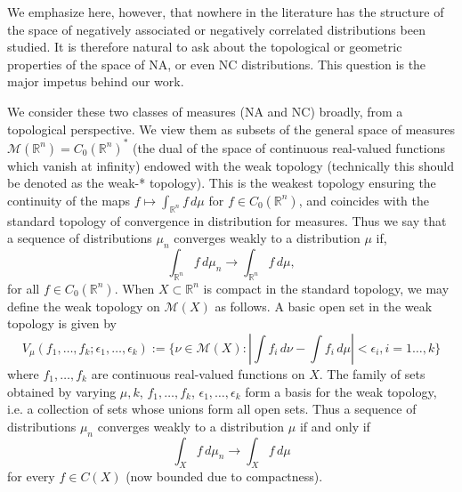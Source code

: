 \documentclass[11pt]{article}
\newcommand{\R}{\mathbb{R}}
\newcommand{\m}{\mathcal{M}}
\begin{document}
We emphasize here, however, that nowhere in the literature has the structure of the space of negatively associated or negatively correlated distributions been studied. It is therefore natural to ask about the topological or geometric properties of the space of NA, or even NC distributions. This question is the major impetus behind our work.






We consider these two classes of measures (NA and NC) broadly,
from a topological perspective. We view them as subsets of 
the general space of measures 
$\m(\R^n)=C_0(\R^n)^*$ (the dual of the space of continuous real-valued functions which vanish at infinity) endowed with the weak topology (technically this should be denoted as the weak-* topology).
This is the weakest topology ensuring the continuity of 
the maps $f\mapsto \int_{\R^n} f\, d\mu$ for $f\in C_0(\R^n)$, and coincides with the standard topology of convergence in distribution for measures. Thus we say that a
 sequence of distributions $\mu_n$ converges weakly to a distribution $\mu$
if,
\[
\int_{\R^n} f\, d\mu_n \to \int_{\R^n} f\, d\mu,
\]
for all $f\in C_0(\R^n)$. When $X\subset \R^n$ is compact in the standard topology, we may define
the weak topology on $\m(X)$ as follows. 
A basic open set in
the weak topology is given by \cite{parth, Reed}
\begin{equation}\label{openset}
V_{\mu}(f_1,\dots, f_k ; \epsilon_1,\dots, \epsilon_k) :=
\big\{\nu \in \m(X) : \left| \int f_i \, d\nu - \int f_i \, d\mu\right| < \epsilon_i, i=1\dots, k\big\}
\end{equation}
where $f_1,\dots, f_k$ are continuous real-valued functions on $X$. The family of sets obtained by varying 
$\mu, k$, $f_1,\dots, f_k$, $\epsilon_1,\dots, \epsilon_k$ form a basis for 
the weak topology, i.e. a collection of sets whose unions form all open sets. 
Thus a sequence of distributions $\mu_n$ converges weakly to 
a distribution $\mu$ if and only if 
\[
\int_{X} f\, d\mu_n \to \int_{X} f \, d\mu
\]
for every $f\in C(X)$ (now bounded due to compactness). 
\end{document}

